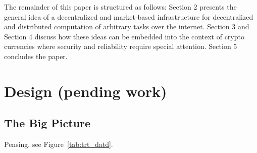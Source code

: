 \documentclass{sig-alternate}
\begin{document}
The remainder of this paper is structured as follows:
Section 2 presents the general idea of a decentralized and market-based infrastructure for decentralized and distributed computation of arbitrary tasks over the internet. Section 3 and Section 4 discuss how these ideas can be embedded into the context of crypto currencies where security and reliability require special attention. Section 5 concludes the paper.
\section{Design (pending work)}

\subsection{The Big Picture}

Pensing, see Figure~\ref{tab:trt_datd}.
\end{document}
